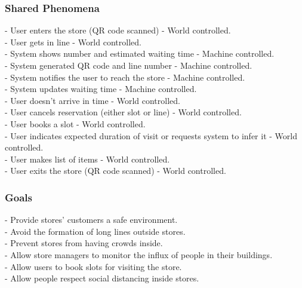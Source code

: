 \documentclass{article}
\begin{document}
\subsubsection{Shared Phenomena}
\noindent\medskip
[SP1] - User enters the store (QR code scanned) - World controlled.\\
\noindent\medskip
[SP2] - User gets in line - World controlled.\\
\noindent\medskip
[SP3] - System shows number and estimated waiting time - Machine controlled.\\
\noindent\medskip
[SP4] - System generated QR code and line number - Machine controlled.\\
\noindent\medskip
[SP5] - System notifies the user to reach the store - Machine controlled.\\
\noindent\medskip
[SP6] - System updates waiting time - Machine controlled.\\
\noindent\medskip
[SP7] - User doesn't arrive in time - World controlled.\\
\noindent\medskip
[SP8] - User cancels reservation (either slot or line) - World controlled.\\
\noindent\medskip
[SP9] - User books a slot - World controlled.\\
\noindent\medskip
[SP10] - User indicates expected duration of visit or requests system to infer it - World controlled.\\
\noindent\medskip
[SP11] - User makes list of items - World controlled.\\
\noindent\medskip
[SP12] - User exits the store (QR code scanned) - World controlled.\\
\subsubsection{Goals}
\noindent\medskip
[G1] - Provide stores’ customers a safe environment.\\
\noindent\medskip
[G2] - Avoid the formation of long lines outside stores.\\
\noindent\medskip
[G3] - Prevent stores from having crowds inside.\\
\noindent\medskip
[G4] - Allow store managers to monitor the influx of people in their buildings.\\
\noindent\medskip
[G5] - Allow users to book slots for visiting the store.\\
\noindent\medskip
[G6] - Allow people respect social distancing inside stores.\\
\end{document}
